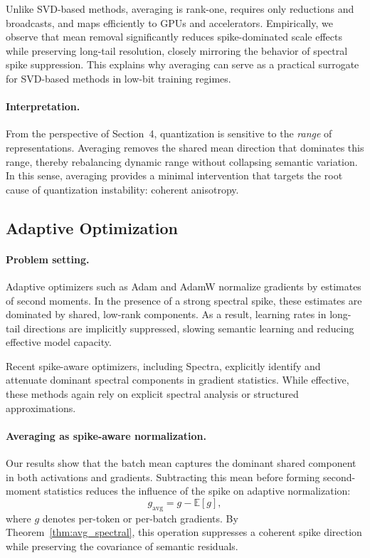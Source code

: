 Unlike SVD-based methods, averaging is rank-one, requires only reductions and
broadcasts, and maps efficiently to GPUs and accelerators.
Empirically, we observe that mean removal significantly reduces spike-dominated
scale effects while preserving long-tail resolution, closely mirroring the
behavior of spectral spike suppression.
This explains why averaging can serve as a practical surrogate for SVD-based
methods in low-bit training regimes.

\paragraph{Interpretation.}
From the perspective of Section~4, quantization is sensitive to the \emph{range}
of representations.
Averaging removes the shared mean direction that dominates this range, thereby
rebalancing dynamic range without collapsing semantic variation.
In this sense, averaging provides a minimal intervention that targets the root
cause of quantization instability: coherent anisotropy.

\subsection{Adaptive Optimization}
\label{subsec:optimization}

\paragraph{Problem setting.}
Adaptive optimizers such as Adam and AdamW normalize gradients by estimates of
second moments.
In the presence of a strong spectral spike, these estimates are dominated by
shared, low-rank components.
As a result, learning rates in long-tail directions are implicitly suppressed,
slowing semantic learning and reducing effective model capacity.

Recent spike-aware optimizers, including Spectra, explicitly identify and
attenuate dominant spectral components in gradient statistics.
While effective, these methods again rely on explicit spectral analysis or
structured approximations.

\paragraph{Averaging as spike-aware normalization.}
Our results show that the batch mean captures the dominant shared component in
both activations and gradients.
Subtracting this mean before forming second-moment statistics reduces the
influence of the spike on adaptive normalization:
\[
g_{\mathrm{avg}} = g - \mathbb{E}[g],
\]
where $g$ denotes per-token or per-batch gradients.
By Theorem~\ref{thm:avg_spectral}, this operation suppresses a coherent spike
direction while preserving the covariance of semantic residuals.

